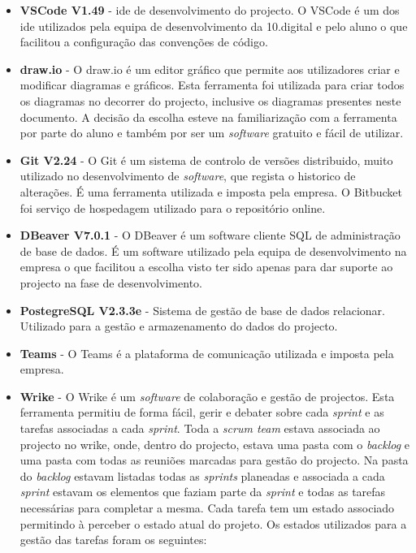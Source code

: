 \begin{itemize}
	\item \textbf{VSCode V1.49}\cite{ft1} - \acrfull{ide} de desenvolvimento do projecto. O VSCode é um dos \acrshort{ide} utilizados pela equipa de desenvolvimento da 10.digital e pelo aluno o que facilitou a configuração das convenções de código.
	\item \textbf{draw.io}\cite{ft2} - O draw.io é um editor gráfico que permite aos utilizadores criar e modificar diagramas e gráficos. Esta ferramenta foi utilizada para criar todos os diagramas no decorrer do projecto, inclusive os diagramas presentes neste documento. A decisão da escolha esteve na familiarização com a ferramenta por parte do aluno e também por ser um \textit{software} gratuito e fácil de utilizar.
	\item \textbf{Git V2.24}\cite{ft3} - O Git é um sistema de controlo de versões distribuido, muito utilizado no desenvolvimento de \textit{software}, que regista o historico de alterações. É uma ferramenta utilizada e imposta pela empresa. O Bitbucket\cite{bb} foi serviço de hospedagem utilizado para o repositório online.
	\item \textbf{DBeaver V7.0.1}\cite{ft4} - O DBeaver é um software cliente SQL de administração de base de dados. É um software utilizado pela equipa de desenvolvimento na empresa o que facilitou a escolha visto ter sido apenas para dar suporte ao projecto na fase de desenvolvimento.
	\item \textbf{PostegreSQL V2.3.3e} - Sistema de gestão de base de dados relacionar. Utilizado para a gestão e armazenamento do dados do projecto.
	\item \textbf{Teams}\cite{ft5} - O Teams é a plataforma de comunicação utilizada e imposta pela empresa.
	\item \textbf{Wrike}\cite{ft6} - O Wrike é um \textit{software} de colaboração e gestão de projectos. Esta ferramenta permitiu de forma fácil, gerir e debater sobre cada \textit{sprint} e as tarefas associadas a cada \textit{sprint}. Toda a \textit{scrum team} estava associada ao projecto no wrike, onde, dentro do projecto, estava uma pasta com o \textit{backlog} e uma pasta com todas as reuniões marcadas para gestão do projecto. Na pasta do \textit{backlog} estavam listadas todas as \textit{sprints} planeadas e associada a cada \textit{sprint} estavam os elementos que faziam parte da \textit{sprint} e todas as tarefas necessárias para completar a mesma. Cada tarefa tem um estado associado permitindo à  perceber o estado atual do projeto. Os estados utilizados para a gestão das tarefas foram os seguintes:

\end{itemize}
